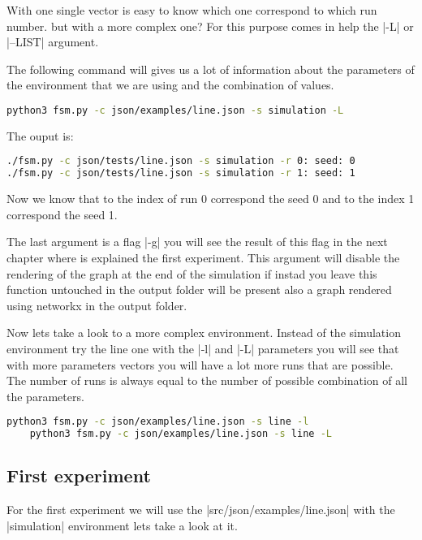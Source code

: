 \documentclass[10pt,journal,onecolumn]{IEEEtran}
\begin{document}
With one single vector is easy to know which one correspond to which run number.
but with a more complex one?
For this purpose comes in help the |-L| or |--LIST| argument.

The following command will gives us a lot of information about the parameters
of the environment that we are using and the combination of values.

\begin{lstlisting}[language=bash]
	python3 fsm.py -c json/examples/line.json -s simulation -L
\end{lstlisting}

The ouput is:
\begin{lstlisting}[language=bash]
./fsm.py -c json/tests/line.json -s simulation -r 0: seed: 0
./fsm.py -c json/tests/line.json -s simulation -r 1: seed: 1
\end{lstlisting}

Now we know that to the index of run 0 correspond the seed 0 and to the 
index 1 correspond the seed 1.

The last argument is a flag |-g| you will see the result of this flag in the next
chapter where is explained the first experiment.
This argument will disable the rendering of the graph at the end of the simulation
if instad you leave this function untouched in the output folder will be
present also a graph rendered using networkx in the output folder.

Now lets take a look to a more complex environment.
Instead of the simulation environment try the line one with the |-l| and |-L|
parameters you will see that with more parameters vectors you will have a lot 
more runs that are possible.
The number of runs is always equal to the number of possible combination of 
all the parameters.

\begin{lstlisting}[language=bash]
	python3 fsm.py -c json/examples/line.json -s line -l
	python3 fsm.py -c json/examples/line.json -s line -L
\end{lstlisting}

\subsection{First experiment}
\label{subsec:first_exp}

For the first experiment we will use the |src/json/examples/line.json| with the
|simulation| environment lets take a look at it.
\end{document}
